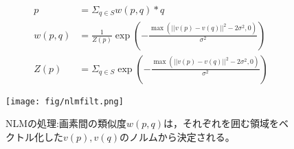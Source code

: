 \begin{align}
	p &= \Sigma_{q\in S} w(p,q) * q\\
	w(p,q) &= \frac{1}{Z(p)} \exp\left(-\frac{\max(||v(p) - v(q)||^2 - 2\sigma^2, 0)}{\sigma^2}\right)\\
	Z(p) &= \Sigma_{q\in S} \exp\left(-\frac{\max(||v(p) - v(q)||^2 - 2\sigma^2, 0)}{\sigma^2}\right)
\end{align}

\begin{figure}[H]
	 \centering
	 \texttt{[image: fig/nlmfilt.png]}
	 \caption{NLMの処理:画素間の類似度$w(p,q)$は，それぞれを囲む領域をベクトル化した$v(p), v(q)$のノルムから決定される。}
	 \label{fig:nlmfilt}
\end{figure}